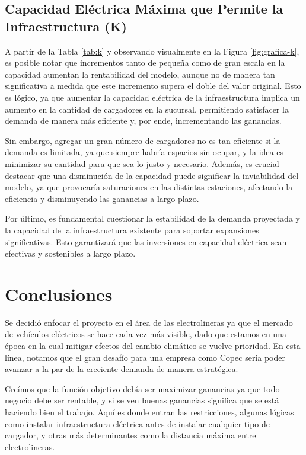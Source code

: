 \documentclass[letterpaper]{article}
\begin{document}
\begin{flushleft}
	\subsection{Capacidad Eléctrica Máxima que Permite la Infraestructura (K)}

	A partir de la Tabla \ref{tab:k} y observando visualmente en la Figura \ref{fig:grafica-k}, es posible notar que incrementos tanto de pequeña como de gran escala en la capacidad aumentan la rentabilidad del modelo, aunque no de manera tan significativa a medida que este incremento supera el doble del valor original. Esto es lógico, ya que aumentar la capacidad eléctrica de la infraestructura implica un aumento en la cantidad de cargadores en la sucursal, permitiendo satisfacer la demanda de manera más eficiente y, por ende, incrementando las ganancias.

	Sin embargo, agregar un gran número de cargadores no es tan eficiente si la demanda es limitada, ya que siempre habría espacios sin ocupar, y la idea es minimizar su cantidad para que sea lo justo y necesario. Además, es crucial destacar que una disminución de la capacidad puede significar la inviabilidad del modelo, ya que provocaría saturaciones en las distintas estaciones, afectando la eficiencia y disminuyendo las ganancias a largo plazo.

	Por último, es fundamental cuestionar la estabilidad de la demanda proyectada y la capacidad de la infraestructura existente para soportar expansiones significativas. Esto garantizará que las inversiones en capacidad eléctrica sean efectivas y sostenibles a largo plazo.

	\section{Conclusiones}

	Se decidió enfocar el proyecto en el área de las electrolineras ya que el mercado de vehículos eléctricos se hace cada vez más visible, dado que estamos en una época en la cual mitigar efectos del cambio climático se vuelve prioridad. En esta línea, notamos que el gran desafío para una empresa como Copec sería poder avanzar a la par de la creciente demanda de manera estratégica.

	Creímos que la función objetivo debía ser maximizar ganancias ya que todo negocio debe ser rentable, y si se ven buenas ganancias significa que se está haciendo bien el trabajo. Aquí es donde entran las restricciones, algunas lógicas como instalar infraestructura eléctrica antes de instalar cualquier tipo de cargador, y otras más determinantes como la distancia máxima entre electrolineras.


\end{flushleft}
\end{document}
